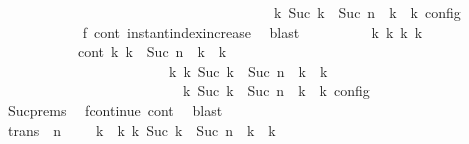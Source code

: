 \begin{isabellebody}
\ \ \ \ \ \ \ \ \ \ \ \ \ \ \ \ \ \ \ \ \ \ \ \ \ \ \ \ \ \ \ \ \ \ \ {\isasymand}\ {\isasymrho}\ {\isasymin}\ {\isasymlbrakk}\ {\isasymGamma}\isactrlsub k{\isacharprime}{\isacharcomma}\ Suc\ {\isacharparenleft}{\isasymdelta}k\ {\isacharplus}\ Suc\ n{\isacharparenright}\ {\isasymturnstile}\ {\isasymPsi}\isactrlsub k{\isacharprime}\ {\isasymtriangleright}\ {\isasymPhi}\isactrlsub k{\isacharprime}\ {\isasymrbrakk}\isactrlsub c\isactrlsub o\isactrlsub n\isactrlsub f\isactrlsub i\isactrlsub g{\isacartoucheclose}\isanewline
\ \ \ \ \ \ \ \ \ \ \isamarkupfalse%
\ f{}\ cont\ instant{\isacharunderscore}index{\isacharunderscore}increase\ \isamarkupfalse%
\ blast\isanewline
\ \ \ \ \ \ \ \ \isamarkupfalse%
\ {\isasymGamma}\isactrlsub k{\isacharprime}\ {\isasymPsi}\isactrlsub k{\isacharprime}\ {\isasymPhi}\isactrlsub k{\isacharprime}\ k{\isacharprime}\isanewline
\ \ \ \ \ \ \ \ \ \ \ cont{}{\isacharcolon}\ {\isacartoucheopen}{\isacharparenleft}{\isacharparenleft}{\isasymGamma}\isactrlsub k{\isacharcomma}\ {\isasymdelta}k\ {\isacharplus}\ Suc\ n\ {\isasymturnstile}\ {\isasymPsi}\isactrlsub k\ {\isasymtriangleright}\ {\isasymPhi}\isactrlsub k{\isacharparenright}\isanewline
\ \ \ \ \ \ \ \ \ \ \ \ \ \ \ \ \ \ \ \ \ \ \ \ {\isasymhookrightarrow}\isactrlbsup k{\isacharprime}\isactrlesup \ {\isacharparenleft}{\isasymGamma}\isactrlsub k{\isacharprime}{\isacharcomma}\ Suc\ {\isacharparenleft}{\isasymdelta}k\ {\isacharplus}\ Suc\ n{\isacharparenright}\ {\isasymturnstile}\ {\isasymPsi}\isactrlsub k{\isacharprime}\ {\isasymtriangleright}\ {\isasymPhi}\isactrlsub k{\isacharprime}{\isacharparenright}{\isacharparenright}\isanewline
\ \ \ \ \ \ \ \ \ \ \ \ \ \ \ \ \ \ \ \ \ \ {\isasymand}\ {\isasymrho}\ {\isasymin}\ {\isasymlbrakk}\ {\isasymGamma}\isactrlsub k{\isacharprime}{\isacharcomma}\ Suc\ {\isacharparenleft}{\isasymdelta}k\ {\isacharplus}\ Suc\ n{\isacharparenright}\ {\isasymturnstile}\ {\isasymPsi}\isactrlsub k{\isacharprime}\ {\isasymtriangleright}\ {\isasymPhi}\isactrlsub k{\isacharprime}\ {\isasymrbrakk}\isactrlsub c\isactrlsub o\isactrlsub n\isactrlsub f\isactrlsub i\isactrlsub g{\isacartoucheclose}\isanewline
\ \ \ \ \ \ \ \ \ \ \isamarkupfalse%
\ Suc{\isachardot}prems\ \isamarkupfalse%
\ fcontinue\ cont\ \isamarkupfalse%
\ blast\isanewline
\ \ \ \ \ \ \ \ \isamarkupfalse%
\ trans{\isacharcolon}\ {\isacartoucheopen}{\isacharparenleft}{\isasymGamma}{\isacharcomma}\ n\ {\isasymturnstile}\ {\isasymPsi}\ {\isasymtriangleright}\ {\isasymPhi}{\isacharparenright}\ {\isasymhookrightarrow}\isactrlbsup k\ {\isacharplus}\ k{\isacharprime}\isactrlesup \ {\isacharparenleft}{\isasymGamma}\isactrlsub k{\isacharprime}{\isacharcomma}\ Suc\ {\isacharparenleft}{\isasymdelta}k\ {\isacharplus}\ Suc\ n{\isacharparenright}\ {\isasymturnstile}\ {\isasymPsi}\isactrlsub k{\isacharprime}\ {\isasymtriangleright}\ {\isasymPhi}\isactrlsub k{\isacharprime}{\isacharparenright}{\isacartoucheclose}\isanewline

\end{isabellebody}
